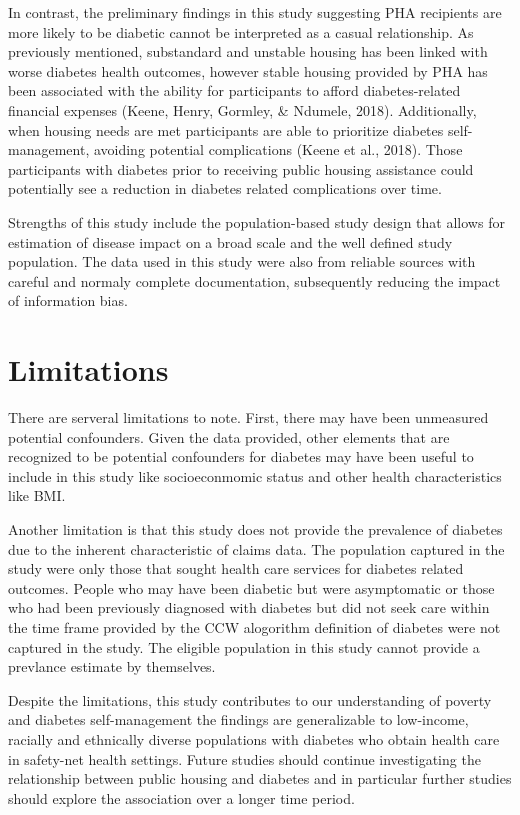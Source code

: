 \documentclass [11pt, proquest] {uwthesis}[2015/03/03]
\begin{document}
In contrast, the preliminary findings in this study suggesting PHA
recipients are more likely to be diabetic cannot be interpreted as a
casual relationship. As previously mentioned, substandard and unstable
housing has been linked with worse diabetes health outcomes, however
stable housing provided by PHA has been associated with the ability for
participants to afford diabetes-related financial expenses (Keene,
Henry, Gormley, \& Ndumele, 2018). Additionally, when housing needs are
met participants are able to prioritize diabetes self-management,
avoiding potential complications (Keene et al., 2018). Those
participants with diabetes prior to receiving public housing assistance
could potentially see a reduction in diabetes related complications over
time.

Strengths of this study include the population-based study design that
allows for estimation of disease impact on a broad scale and the well
defined study population. The data used in this study were also from
reliable sources with careful and normaly complete documentation,
subsequently reducing the impact of information bias.

\section{Limitations}\label{limitations}

There are serveral limitations to note. First, there may have been
unmeasured potential confounders. Given the data provided, other
elements that are recognized to be potential confounders for diabetes
may have been useful to include in this study like socioeconmomic status
and other health characteristics like BMI.

Another limitation is that this study does not provide the prevalence of
diabetes due to the inherent characteristic of claims data. The
population captured in the study were only those that sought health care
services for diabetes related outcomes. People who may have been
diabetic but were asymptomatic or those who had been previously
diagnosed with diabetes but did not seek care within the time frame
provided by the CCW alogorithm definition of diabetes were not captured
in the study. The eligible population in this study cannot provide a
prevlance estimate by themselves.

Despite the limitations, this study contributes to our understanding of
poverty and diabetes self-management the findings are generalizable to
low-income, racially and ethnically diverse populations with diabetes
who obtain health care in safety-net health settings. Future studies
should continue investigating the relationship between public housing
and diabetes and in particular further studies should explore the
association over a longer time period.
\end{document}
